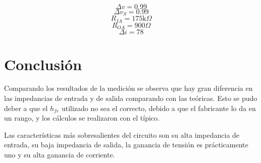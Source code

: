 \documentclass[../../main.tex]{subfiles}
\begin{document}
$$\Delta v = 0.99$$
$$ \Delta v_S =0.99 $$
$$ R_{IA} = 175\mathrm{k}\Omega $$
$$R_{OA}=900\Omega $$
$$\Delta i= 78 $$


\section{Conclusión}
Comparando los resultados de la medición se observa que hay gran diferencia en las impedancias de entrada y de salida comparando con las te\'oricas. Esto se pudo deber a que el $h_{fe}$ utilizado no sea el correcto, debido a que el fabricante lo da en un rango, y los cálculos se realizaron con el t\'ipico. 
\par Las características más sobresalientes del circuito son su alta impedancia de entrada, su baja impedancia de salida, la ganancia de tensión es prácticamente uno y su alta ganancia de corriente.
\end{document}
